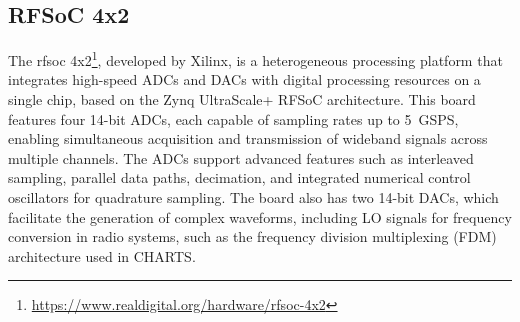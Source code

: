 \subsection{RFSoC 4x2}
\label{sec:rfsoc}
The \Gls{rfsoc} 4x2\footnote{\url{https://www.realdigital.org/hardware/rfsoc-4x2}}, developed by Xilinx, is a heterogeneous processing platform that integrates high-speed ADCs and DACs with digital processing resources on a single chip, based on the Zynq UltraScale+ RFSoC architecture. This board features four 14-bit ADCs, each capable of sampling rates up to 5~GSPS, enabling simultaneous acquisition and transmission of wideband signals across multiple channels. The ADCs support advanced features such as interleaved sampling, parallel data paths, decimation, and integrated numerical control oscillators for quadrature sampling. The board also has two 14-bit DACs, which facilitate the generation of complex waveforms, including LO signals for frequency conversion in radio systems, such as the frequency division multiplexing (FDM) architecture used in CHARTS.
\\


